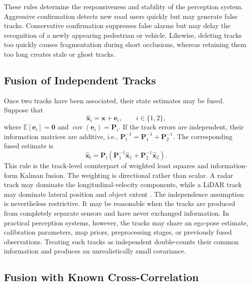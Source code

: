\documentclass[graybox,envcountchap]{style/SNmono}
\begin{document}
These rules determine the responsiveness and stability of the perception
system. Aggressive confirmation detects new road users quickly but may
generate false tracks. Conservative confirmation suppresses false alarms
but may delay the recognition of a newly appearing pedestrian or vehicle.
Likewise, deleting tracks too quickly causes fragmentation during short
occlusions, whereas retaining them too long creates stale or ghost tracks.


\subsection{Fusion of Independent Tracks}


Once two tracks have been associated, their state estimates may be fused.
Suppose that
\begin{equation}
\widehat{\mathbf{x}}_{i}=\mathbf{x}+\mathbf{e}_{i},\qquad i\in\{1,2\},
\label{eq:local-track-error}
\end{equation}
where
$\mathbb{E}[\mathbf{e}_{i}]=\mathbf{0}$ and $\operatorname{cov}(\mathbf{e}_{i})=\mathbf{P}_{i}$. If the track errors are independent, their information matrices are
additive, i.e.,  $\mathbf{P}_{\mathrm{f}}^{-1}=\mathbf{P}_{1}^{-1}+\mathbf{P}_{2}^{-1}$. The corresponding fused estimate is
\begin{equation}
\widehat{\mathbf{x}}_{\mathrm{f}}=\mathbf{P}_{\mathrm{f}}\left(\mathbf{P}_{1}^{-1}\widehat{\mathbf{x}}_{1}+\mathbf{P}_{2}^{-1}\widehat{\mathbf{x}}_{2}\right).
\label{eq:independent-track-fusion-state}
\end{equation}
This rule is the track-level counterpart of weighted least squares and information-form Kalman fusion. The weighting is directional rather than scalar. A radar track may dominate the longitudinal-velocity components, while a LiDAR track may dominate lateral position and object extent
\cite{barshalom1995multitarget,barshalom2011tracking}. The independence assumption is nevertheless restrictive. It may be
reasonable when the tracks are produced from completely separate sensors
and have never exchanged information. In practical perception systems,
however, the tracks may share an ego-pose estimate, calibration parameters,
map priors, preprocessing stages, or previously fused observations.
Treating such tracks as independent double-counts their common information
and produces an unrealistically small covariance.


\subsection{Fusion with Known Cross-Correlation}
\end{document}

